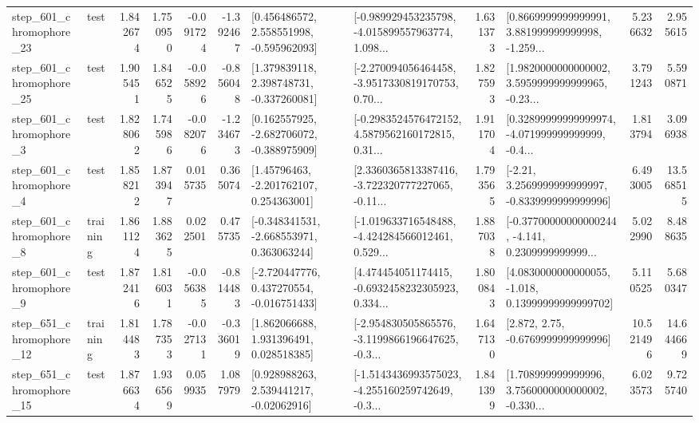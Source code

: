 \begin{tabular}{llrrrrllrlrr}
  step\_601\_chromophore\_23 &      test &      1.842674 &    1.750950 &     -0.091724 & -1.392467 &    [0.456486572, 2.558551998, -0.595962093] &  [-0.989929453235798, -4.015899557963774, 1.098... &       1.631373 &  [0.8669999999999991, 3.881999999999998, -1.259... &            5.236632 &          2.955615 \\
  step\_601\_chromophore\_25 &      test &      1.905451 &    1.846525 &     -0.058926 & -0.856048 &    [1.379839118, 2.398748731, -0.337260081] &  [-2.270094056464458, -3.9517330819170753, 0.70... &       1.827593 &  [1.9820000000000002, 3.5959999999999965, -0.23... &            3.791243 &          5.590871 \\
   step\_601\_chromophore\_3 &      test &      1.828062 &    1.745986 &     -0.082076 & -1.234673 &   [0.162557925, -2.682706072, -0.388975909] &  [-0.2983524576472152, 4.5879562160172815, 0.31... &       1.911704 &  [0.32899999999999974, -4.071999999999999, -0.4... &            1.813794 &          3.096938 \\
   step\_601\_chromophore\_4 &      test &      1.858212 &    1.873947 &      0.015735 &  0.365074 &     [1.45796463, -2.201762107, 0.254363001] &  [2.3360365813387416, -3.722320777227065, -0.11... &       1.793565 &   [-2.21, 3.2569999999999997, -0.8339999999999996] &            6.493005 &         13.568515 \\
   step\_601\_chromophore\_8 &  training &      1.861124 &    1.883625 &      0.022501 &  0.475735 &   [-0.348341531, -2.668553971, 0.363063244] &  [-1.019633716548488, -4.424284566012461, 0.529... &       1.887038 &  [-0.37700000000000244, -4.141, 0.2309999999999... &            5.022990 &          8.488635 \\
   step\_601\_chromophore\_9 &      test &      1.872416 &    1.816031 &     -0.056385 & -0.814483 &   [-2.720447776, 0.437270554, -0.016751433] &  [4.474454051174415, -0.6932458232305923, 0.334... &       1.800843 &  [4.0830000000000055, -1.018, 0.13999999999999702] &            5.110525 &          5.680347 \\
  step\_651\_chromophore\_12 &  training &      1.814483 &    1.787353 &     -0.027131 & -0.336019 &     [1.862066688, 1.931396491, 0.028518385] &  [-2.954830505865576, -3.1199866196647625, -0.3... &       1.647130 &                 [2.872, 2.75, -0.6769999999999996] &           10.521496 &         14.644669 \\
  step\_651\_chromophore\_15 &      test &      1.876634 &    1.936569 &      0.059935 &  1.087979 &     [0.928988263, 2.539441217, -0.02062916] &  [-1.5143436993575023, -4.255160259742649, -0.3... &       1.841399 &  [1.708999999999996, 3.7560000000000002, -0.330... &            6.023573 &          9.725740 \\

\end{tabular}
